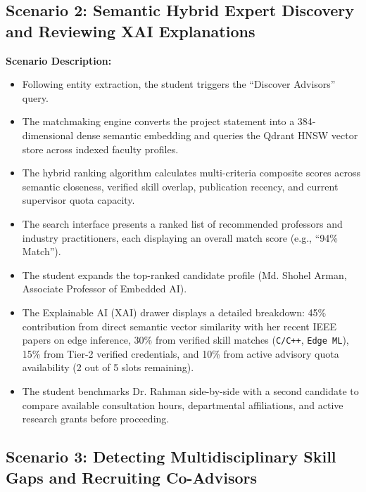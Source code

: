 \subsection{Scenario 2: Semantic Hybrid Expert Discovery and Reviewing XAI Explanations}
\label{subsec:scenario2}

\noindent\textbf{Scenario Description:}
\begin{itemize}[label=\textbf{\tiny\ensuremath{\blacksquare}}]
    \item Following entity extraction, the student triggers the ``Discover Advisors'' query.
    \item The matchmaking engine converts the project statement into a 384-dimensional dense semantic embedding and queries the Qdrant HNSW vector store across indexed faculty profiles.
    \item The hybrid ranking algorithm calculates multi-criteria composite scores across semantic closeness, verified skill overlap, publication recency, and current supervisor quota capacity.
    \item The search interface presents a ranked list of recommended professors and industry practitioners, each displaying an overall match score (e.g., ``94\% Match'').
    \item The student expands the top-ranked candidate profile (Md. Shohel Arman, Associate Professor of Embedded AI).
    \item The Explainable AI (XAI) drawer displays a detailed breakdown: 45\% contribution from direct semantic vector similarity with her recent IEEE papers on edge inference, 30\% from verified skill matches (\texttt{C/C++}, \texttt{Edge ML}), 15\% from Tier-2 verified credentials, and 10\% from active advisory quota availability (2 out of 5 slots remaining).
    \item The student benchmarks Dr. Rahman side-by-side with a second candidate to compare available consultation hours, departmental affiliations, and active research grants before proceeding.
\end{itemize}

\subsection{Scenario 3: Detecting Multidisciplinary Skill Gaps and Recruiting Co-Advisors}
\label{subsec:scenario3}


